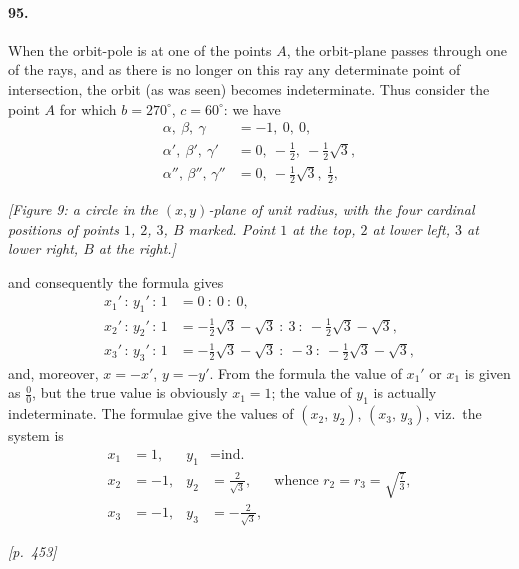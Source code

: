 \documentclass[11pt]{article}
\begin{document}
\paragraph{95.} When the orbit-pole is at one of the points $A$, the orbit-plane passes through one of the rays, and as there is no longer on this ray any determinate point of intersection, the orbit (as was seen) becomes indeterminate. Thus consider the point $A$ for which $b = 270^{\circ}$, $c = 60^{\circ}$: we have
\[
\begin{aligned}
\alpha,\ \beta,\ \gamma &= -1,\ 0,\ 0,\\
\alpha',\ \beta',\ \gamma' &= 0,\ -\tfrac{1}{2},\ -\tfrac{1}{2}\sqrt{3},\\
\alpha'',\, \beta'',\, \gamma'' &= 0,\ -\tfrac{1}{2}\sqrt{3},\ \tfrac{1}{2},
\end{aligned}
\]

\begin{center}
\textit{[Figure 9: a circle in the $(x,y)$-plane of unit radius, with the four cardinal positions of points $1$, $2$, $3$, $B$ marked. Point $1$ at the top, $2$ at lower left, $3$ at lower right, $B$ at the right.]}
\end{center}

and consequently the formula gives
\[
\begin{aligned}
x_{1}'\,:\,y_{1}'\,:\,1 &= 0\ :\ 0\ :\ 0,\\
x_{2}'\,:\,y_{2}'\,:\,1 &= -\tfrac{1}{2}\sqrt{3} - \sqrt{3}\ :\ 3\ :\ -\tfrac{1}{2}\sqrt{3} - \sqrt{3},\\
x_{3}'\,:\,y_{3}'\,:\,1 &= -\tfrac{1}{2}\sqrt{3} - \sqrt{3}\ :\ -3\ :\ -\tfrac{1}{2}\sqrt{3} - \sqrt{3},
\end{aligned}
\]
and, moreover, $x = -x'$, $y = -y'$. From the formula the value of $x_{1}'$ or $x_{1}$ is given as $\tfrac{0}{0}$, but the true value is obviously $x_{1} = 1$; the value of $y_{1}$ is actually indeterminate. The formulae give the values of $(x_{2},\, y_{2})$, $(x_{3},\, y_{3})$, viz.\ the system is
\[
\begin{aligned}
x_{1} &= 1, & y_{1} &= \text{ind.}\\
x_{2} &= -1, & y_{2} &= \tfrac{2}{\sqrt{3}}, & \text{whence } r_{2} = r_{3} = \sqrt{\tfrac{7}{3}},\\
x_{3} &= -1, & y_{3} &= -\tfrac{2}{\sqrt{3}},
\end{aligned}
\]

\medskip
\noindent\textit{[p.~453]}

\medskip
\end{document}
